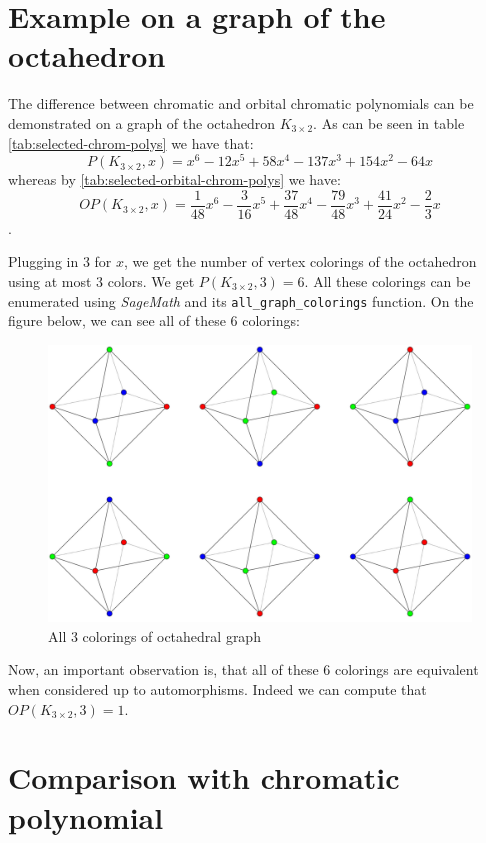 \section{Example on a graph of the octahedron}

The difference between chromatic and orbital chromatic polynomials can be demonstrated on a graph of the octahedron $K_{3 \times 2}$. As can be seen in table \ref{tab:selected-chrom-polys} we have that: $$P(K_{3 \times 2},x) = x^{6} - 12x^{5} + 58x^{4} - 137x^{3} + 154x^{2} - 64x$$ whereas by \ref{tab:selected-orbital-chrom-polys} 
 we have: $$OP(K_{3 \times 2},x) = \frac{1}{48}x^{6} - \frac{3}{16}x^{5} + \frac{37}{48}x^{4} - \frac{79}{48}x^{3} + \frac{41}{24}x^{2} - \frac{2}{3}x$$.

Plugging in $3$ for $x$, we get the number of vertex colorings of the octahedron using at most $3$ colors. We get $P(K_{3 \times 2},3) = 6$. All these colorings can be enumerated using \textit{SageMath} \cite{sagemath} and its \verb|all_graph_colorings| function. On the figure below, we can see all of these $6$ colorings:

\begin{figure}[H]
    \centering
    \includegraphics[width=1\textwidth]{../Resources/Figs/octahedron_3-clrings.pdf}
    \caption{All 3 colorings of octahedral graph}
    \label{fig:octahedron-3-clrings}
\end{figure}

Now, an important observation is, that all of these $6$ colorings are equivalent when considered up to automorphisms. Indeed we can compute that $OP(K_{3 \times 2},3) = 1$.


\section{Comparison with chromatic polynomial}

